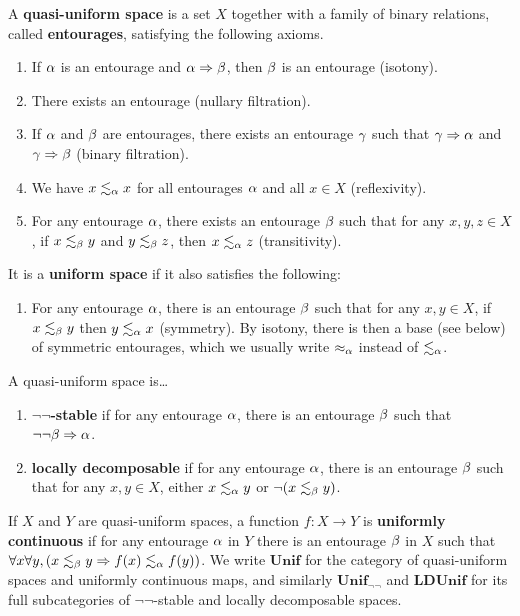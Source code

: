 \documentclass{article}
\def\leapx{\lesssim}
\let\implies\Rightarrow
\def\nn{\ensuremath{\neg\neg}}
\def\Unif{\mathbf{Unif}}
\def\Unifnn{\mathbf{Unif}_{\nn}}
\def\LDUnif{\mathbf{LDUnif}}
\begin{document}
\begin{defn}
  A \textbf{quasi-uniform space} is a set $X$ together with a family of binary relations, called \textbf{entourages}, satisfying the following axioms.
  \begin{enumerate}
  \item If $\alpha$ is an entourage and $\al\implies\be$, then $\beta$ is an entourage (isotony).
  \item There exists an entourage (nullary filtration).
  \item If $\alpha$ and $\beta$ are entourages, there exists an entourage $\gamma$ such that $\gm\implies\al$ and $\gm\implies\be$ (binary filtration).
  \item We have $x\leapx_\al x$ for all entourages $\alpha$ and all $x\in X$ (reflexivity).
  \item For any entourage $\alpha$, there exists an entourage $\beta$ such that for any $x,y,z\in X$, if $x\leapx_\be y$ and $y\leapx_\be z$, then $x\leapx_\al z$ (transitivity).
  \end{enumerate}
  It is a \textbf{uniform space} if it also satisfies the following:
  \begin{enumerate}[resume]
  \item For any entourage $\alpha$, there is an entourage $\beta$ such that for any $x,y\in X$, if $x\leapx_\be y$ then $y\leapx_\al x$ (symmetry).
    By isotony, there is then a base (see below) of symmetric entourages, which we usually write $\approx_\alpha$ instead of $\leapx_\al$.
  \end{enumerate}
  A quasi-uniform space is\dots
  \begin{enumerate}[resume]
  \item \textbf{\nn-stable} if for any entourage $\alpha$, there is an entourage $\beta$ such that $\neg\neg\be\implies \al$. %
  \item \textbf{locally decomposable} if for any entourage $\alpha$, there is an entourage $\beta$ such that for any $x,y\in X$, either $x\leapx_\al y$ or $\neg(x\leapx_\be y)$.
  \end{enumerate}
  If $X$ and $Y$ are quasi-uniform spaces, a function $f:X\to Y$ is \textbf{uniformly continuous} if for any entourage $\alpha$ in $Y$ there is an entourage $\beta$ in $X$ such that $\forall x\forall y, (x\leapx_\be y \implies f(x)\leapx_\al f(y))$.
  We write $\Unif$ for the category of quasi-uniform spaces and uniformly continuous maps, and similarly $\Unifnn$ and $\LDUnif$ for its full subcategories of \nn-stable and locally decomposable spaces.
\end{defn}
\end{document}
